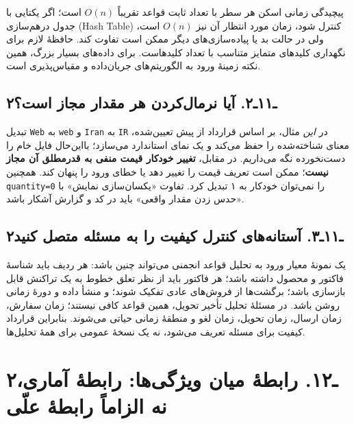 \documentclass[12pt,a4paper,oneside]{book}
\begin{document}
پیچیدگی زمانی اسکن هر سطر با تعداد ثابت قواعد تقریباً \(O(n)\) است؛ اگر یکتایی با جدول درهم‌سازی (Hash Table) کنترل شود، زمان مورد انتظار آن نیز \(O(n)\) است، ولی در حالت بد یا پیاده‌سازی‌های دیگر ممکن است تفاوت کند. حافظهٔ لازم برای نگهداری کلیدهای متمایز متناسب با تعداد کلیدهاست. برای داده‌های بسیار بزرگ، همین نکته زمینهٔ ورود به الگوریتم‌های جریان‌داده و مقیاس‌پذیری است.

\subsection{۲ـ۱۱ـ۲. آیا نرمال‌کردن هر مقدار مجاز است؟}\label{ux640ux6f1ux6f1ux640ux6f2.-ux622ux6ccux627-ux646ux631ux645ux627ux644ux6a9ux631ux62fux646-ux647ux631-ux645ux642ux62fux627ux631-ux645ux62cux627ux632-ux627ux633ux62a}

تبدیل \texttt{Web} به \texttt{web} و \texttt{Iran} به \texttt{IR} در \emph{این} مثال، بر اساس قرارداد از پیش تعیین‌شده، معنای شناخته‌شده را حفظ می‌کند و یک نمای استاندارد می‌سازد؛ بااین‌حال فایل خام را دست‌نخورده نگه می‌داریم. در مقابل، \textbf{تغییر خودکار قیمت منفی به قدرمطلق آن مجاز نیست}؛ ممکن است تعریف قیمت را تغییر دهد یا خطای ورود را پنهان کند. همچنین \texttt{quantity=0} را نمی‌توان خودکار به ۱ تبدیل کرد. تفاوت «یکسان‌سازی نمایش» با «حدس زدن مقدار واقعی» باید در کد و گزارش آشکار باشد.

\subsection{۲ـ۱۱ـ۳. آستانه‌های کنترل کیفیت را به مسئله متصل کنید}\label{ux640ux6f1ux6f1ux640ux6f3.-ux622ux633ux62aux627ux646ux647ux647ux627ux6cc-ux6a9ux646ux62aux631ux644-ux6a9ux6ccux641ux6ccux62a-ux631ux627-ux628ux647-ux645ux633ux626ux644ux647-ux645ux62aux635ux644-ux6a9ux646ux6ccux62f}

یک نمونهٔ معیار ورود به تحلیل قواعد انجمنی می‌تواند چنین باشد: هر ردیف باید شناسهٔ فاکتور و محصول داشته باشد؛ هر فاکتور باید از نظر تعلق خطوط به یک تراکنش قابل بازسازی باشد؛ برگشت‌ها از فروش‌های عادی تفکیک شوند؛ و منشأ داده و دورهٔ زمانی روشن باشد. در مسئلهٔ تحلیل تأخیر تحویل، همین قواعد کافی نیستند؛ زمان سفارش، زمان ارسال، زمان تحویل، زمان لغو و منطقهٔ زمانی حیاتی می‌شوند. بنابراین قرارداد کیفیت برای مسئله تعریف می‌شود، نه یک نسخهٔ عمومی برای همهٔ تحلیل‌ها.

\section{۲ـ۱۲. رابطهٔ میان ویژگی‌ها: رابطهٔ آماری، نه الزاماً رابطهٔ علّی}\label{ux640ux6f1ux6f2.-ux631ux627ux628ux637ux647-ux645ux6ccux627ux646-ux648ux6ccux698ux6afux6ccux647ux627-ux631ux627ux628ux637ux647-ux622ux645ux627ux631ux6cc-ux646ux647-ux627ux644ux632ux627ux645ux627-ux631ux627ux628ux637ux647-ux639ux644ux6cc}
\end{document}
